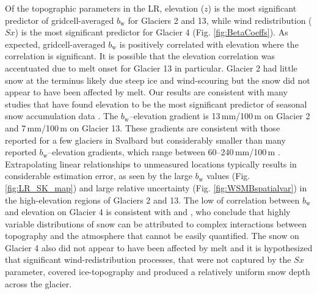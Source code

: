 \documentclass[twocolumn, letterpaper]{igs}
\begin{document}
Of the topographic parameters in the LR, elevation ($z$) is the most significant predictor of gridcell-averaged $b_\mathrm{w}$ for Glaciers 2 and 13, while wind redistribution ($Sx$) is the most significant predictor for Glacier 4 (Fig. \ref{fig:BetaCoeffs}). As expected, gridcell-averaged $b_\mathrm{w}$ is positively correlated with elevation where the correlation is significant. It is possible that the elevation correlation was accentuated due to melt onset for Glacier 13 in particular. Glacier 2 had little snow at the terminus likely due steep ice and wind-scouring but the snow did not appear to have been affected by melt.  Our results are consistent with many studies that have found elevation to be the most significant predictor of seasonal snow accumulation data \citep[e.g.][]{Machguth2006, Grunewald2014, McGrath2015}. The $b_\mathrm{w}$--elevation gradient is 13\,mm/100\,m on Glacier 2 and 7\,mm/100\,m on Glacier 13. These gradients are consistent with those reported for a few glaciers in Svalbard \citep{Winther1998} but considerably smaller than many reported $b_\mathrm{w}$--elevation gradients, which range between 60--240\,mm/100\,m \citep[e.g.][]{Hagen1990,Tveit1996,Winther1998}. Extrapolating linear relationships to unmeasured locations typically results in considerable estimation error, as seen by the large $b_\mathrm{w}$ values (Fig. \ref{fig:LR_SK_map}) and large relative uncertainty (Fig. \ref{fig:WSMBspatialvar}) in the high-elevation regions of Glaciers 2 and 13. The low of correlation between $b_\mathrm{w}$ and elevation on Glacier 4 is consistent with \cite{Grabiec2011} and \cite{Lopez2011}, who conclude that highly variable distributions of snow can be attributed to complex interactions between topography and the atmosphere that cannot be easily quantified. The snow on Glacier 4 also did not appear to have been affected by melt and it is hypothesized that significant wind-redistribution processes, that were not captured by the $Sx$ parameter, covered ice-topography and produced a relatively uniform snow depth across the glacier.
\end{document}
